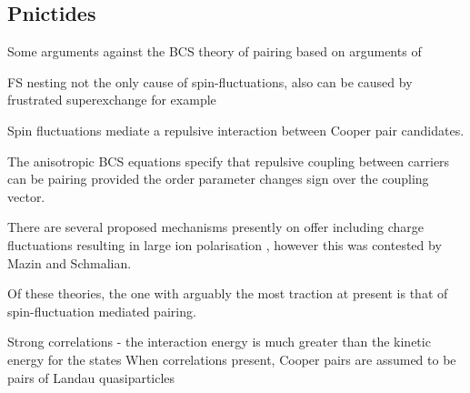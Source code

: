 \subsection{Pnictides}

Some arguments against the BCS theory of pairing \cite{Haule2008,Yndurain2009,Mazin2008} based on arguments of 

FS nesting not the only cause of spin-fluctuations, also can be caused by frustrated superexchange for example 

Spin fluctuations mediate a repulsive interaction between Cooper pair candidates.

The anisotropic BCS equations specify that repulsive coupling between carriers can be pairing provided the order parameter changes sign over the coupling vector.


There are several proposed mechanisms presently on offer including charge fluctuations resulting in large ion polarisation \cite{Berciu2009}, however this was contested by Mazin and Schmalian\cite{Mazin2009}.


Of these theories, the one with arguably the most traction at present is that of spin-fluctuation mediated pairing. 


Strong correlations - the interaction energy is much greater than the kinetic energy for the states
When correlations present, Cooper pairs are assumed to be pairs of Landau quasiparticles


